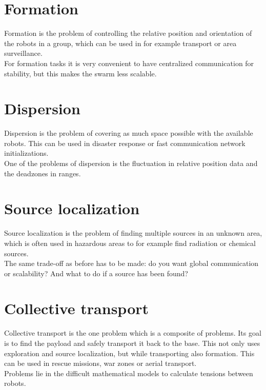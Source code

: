 \documentclass[a4paper]{article}
\begin{document}
\section*{Formation}
Formation is the problem of controlling the relative position and orientation of the robots in a group, which can be used in for example transport or area surveillance. \\
For formation tasks it is very convenient to have centralized communication for stability, but this makes the swarm less scalable.

\section*{Dispersion}
Dispersion is the problem of covering as much space possible with the available robots. This can be used in disaster response or fast communication network initializations. \\
One of the problems of dispersion is the fluctuation in relative position data and the deadzones in ranges.

\section*{Source localization}
Source localization is the problem of finding multiple sources in an unknown area, which is often used in hazardous areas to for example find radiation or chemical sources. \\
The same trade-off as before has to be made: do you want global communication or scalability? And what to do if a source has been found?

\section*{Collective transport}
Collective transport is the one problem which is a composite of problems. Its goal is to find the payload and safely transport it back to the base. This not only uses exploration and source localization, but while transporting also formation. This can be used in rescue missions, war zones or aerial transport.\\
Problems lie in the difficult mathematical models to calculate tensions between robots.
\end{document}
